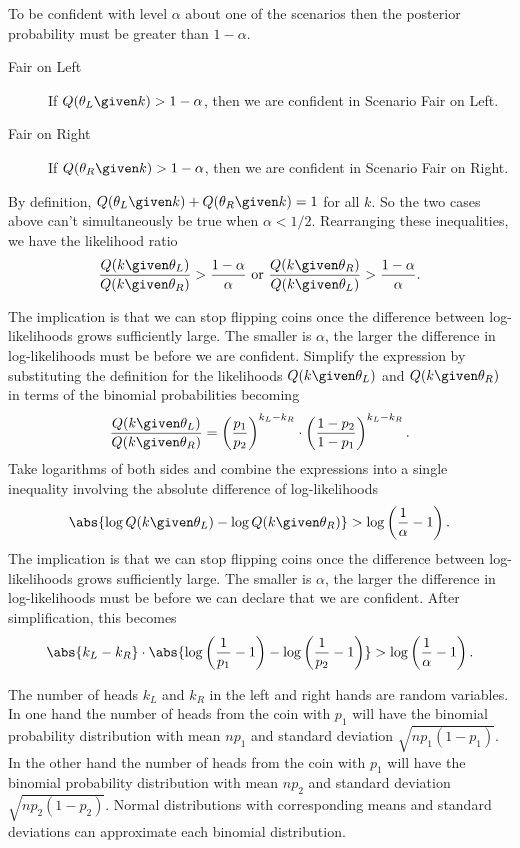 \documentclass[12pt]{article}
\begin{document}
To be confident with level \( \alpha \) about one of the scenarios then
the posterior probability must be greater than \( 1 - \alpha \).
\begin{description}
    \item[Fair on Left]
        If \( Q(\theta_L \given k)>1 -\alpha \), then we are confident
        in Scenario Fair on Left.
    \item[Fair on Right]
        If \( Q(\theta_R \given k)>1 - \alpha \), then we are confident
        in Scenario Fair on Right.
\end{description}
By definition, \( Q(\theta_L \given k ) + Q(\theta_R \given k ) = 1 \)
for all \( k \).  So the two cases above can't simultaneously be true
when \( \alpha < 1/2 \).  Rearranging these inequalities, we have the
likelihood ratio
\[
    \frac{Q(k \given \theta_L)}{Q(k \given \theta_R)} > \frac{1-\alpha}{\alpha}
    \text{ or } \frac{Q(k \given \theta_R)}{Q(k \given \theta_L)} >
    \frac{1-\alpha}{\alpha}.
\]%

The implication is that we can stop flipping coins once the difference
between log-likelihoods grows sufficiently large.  The smaller is \(
\alpha \), the larger the difference in log-likelihoods must be before
we are confident.  Simplify the expression by substituting the
definition for the likelihoods \( Q(k \given \theta_L) \) and \( Q(k
\given \theta_R) \) in terms of the binomial probabilities becoming
\[
    \frac{Q(k \given \theta_L)}{Q(k \given \theta_R)} = \left(\frac{p_1}
    {p_2} \right)^{k_L - k_R} \cdot \left(\frac{1-p_2}{1-p_1} \right)^{k_L
    - k_R}.
\] Take logarithms of both sides and combine the expressions into a
single inequality involving the absolute difference of log-likelihoods
\[
    \abs{\log Q(k \given \theta_L) - \log Q(k \given \theta_R)} > \log
    \left( \frac{1}{\alpha} - 1 \right).
\]%
The implication is that we can stop flipping coins once the difference
between log-likelihoods grows sufficiently large.  The smaller is \(
\alpha \), the larger the difference in log-likelihoods must be before
we can declare that we are confident.  After simplification, this
becomes
\[
    \abs{k_L - k_R} \cdot \abs{ \log\left( \frac{1}{p_1} - 1 \right) -
    \log\left( \frac{1}{p_2} - 1 \right) } > \log \left( \frac{1}{\alpha}
    - 1 \right).
\]

The number of heads \( k_L \) and \( k_R \) in the left and right hands
are random variables.  In one hand the number of heads from the coin
with \( p_1 \) will have the binomial probability distribution with mean
\( np_1 \) and standard deviation \( \sqrt{np_1(1-p_1)} \).  In the
other hand the number of heads from the coin with \( p_1 \) will have
the binomial probability distribution with mean \( np_2 \) and standard
deviation \( \sqrt{np_2(1-p_2)} \).  Normal distributions with
corresponding means and standard deviations can approximate each
binomial distribution.
\end{document}
